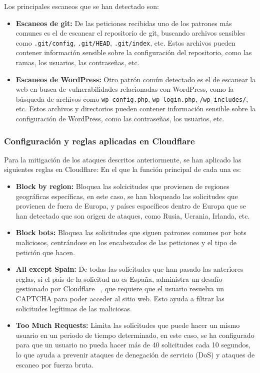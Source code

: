 Los principales escaneos que se han detectado son:
\begin{itemize}
    \item \textbf{Escaneos de git:} De las peticiones recibidas uno de los patrones más comunes es el de escanear el repositorio de git, buscando archivos sensibles como \texttt{.git/config}, \texttt{.git/HEAD}, \texttt{.git/index}, etc. Estos archivos pueden contener información sensible sobre la configuración del repositorio, como las ramas, los usuarios, las contraseñas, etc.
    \item \textbf{Escaneos de WordPress:} Otro patrón común detectado es el de escanear la web en busca de vulnerabilidades relacionadas con WordPress, como la búsqueda de archivos como \texttt{wp-config.php}, \texttt{wp-login.php}, \texttt{/wp-includes/}, etc. Estos archivos y directorios pueden contener información sensible sobre la configuración de WordPress, como las contraseñas, los usuarios, etc.
\end{itemize}

\subsubsection{Configuración y reglas aplicadas en Cloudflare}
Para la mitigación de los ataques descritos anteriormente, se han aplicado las siguientes reglas en Cloudflare:
En el que la función principal de cada una es:
\begin{itemize}
    \item \textbf{Block by region:} Bloquea las solcicitudes que provienen de regiones geográficas específicas, en este caso, se han bloqueado las solicitudes que provienen de fuera de Europa, y países espacíficos dentro de Europa que se han detectado que son origen de ataques, como Rusia, Ucrania, Irlanda, etc.
    \item \textbf{Block bots:} Bloquea las solicitudes que siguen patrones comunes por bots maliciosos, centrándose en los encabezados de las peticiones y el tipo de petición que hacen.
    \item \textbf{All except Spain:} De todas las solicitudes que han pasado las anteriores reglas, si el país de la solicitud no es España, administra un desafío gestionado por Cloudflare ~\cite{CloudflareDocsTeam2025}, que requiere que el usuario resuelva un CAPTCHA para poder acceder al sitio web. Esto ayuda a filtrar las solicitudes legítimas de las maliciosas.
    \item \textbf{Too Much Requests:} Limita las solicitudes que puede hacer un mismo usuario en un periodo de tiempo determinado, en este caso, se ha configurado para que un usuario no pueda hacer más de 40 solicitudes cada 10 segundos, lo que ayuda a prevenir ataques de denegación de servicio (DoS) y ataques de escaneo por fuerza bruta.
\end{itemize}

